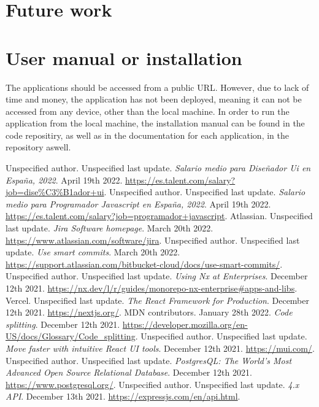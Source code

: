 \documentclass[a4paper, 12pt, oneside]{book}
\begin{document}
\chapter{Future work}
\appendix
\chapter{User manual or installation}
The applications should be accessed from a public URL. However, due to lack of time and money, the application has not been deployed, meaning it can not be accessed from any device, other than the local machine. In order to run the application from the local machine, the installation manual can be found in the code repositiry, as well as in the documentation for each application, in the repository aswell.
\begin{thebibliography}{9}
	Unspecified author. Unspecified last update. \emph{Salario medio para Diseñador Ui en España, 2022}. April 19th 2022. \url{https://es.talent.com/salary?job=dise%C3%B1ador+ui}.
	Unspecified author. Unspecified last update. \emph{Salario medio para Programador Javascript en España, 2022}. April 19th 2022. \url{https://es.talent.com/salary?job=programador+javascript}.
	Atlassian. Unspecified last update. \emph{Jira Software homepage}. March 20th 2022. \url{https://www.atlassian.com/software/jira}.
	Unspecified author. Unspecified last update. \emph{Use smart commits}. March 20th 2022. \url{https://support.atlassian.com/bitbucket-cloud/docs/use-smart-commits/}.
	Unspecified author. Unspecified last update. \emph{Using Nx at Enterprises}. December 12th 2021. \url{https://nx.dev/l/r/guides/monorepo-nx-enterprise#apps-and-libs}.
	Vercel. Unspecified last update. \emph{The React Framework for Production}. December 12th 2021. \url{https://nextjs.org/}.
	MDN contributors. January 28th 2022. \emph{Code splitting}. December 12th 2021. \url{https://developer.mozilla.org/en-US/docs/Glossary/Code_splitting}.
	Unspecified author. Unspecified last update. \emph{Move faster with intuitive React UI tools}. December 12th 2021. \url{https://mui.com/}.
	Unspecified author. Unspecified last update. \emph{PostgresQL: The World's Most Advanced Open Source Relational Database}. December 12th 2021. \url{https://www.postgresql.org/}.
	Unspecified author. Unspecified last update. \emph{4.x API}. December 13th 2021. \url{https://expressjs.com/en/api.html}.

\end{thebibliography}
\end{document}
